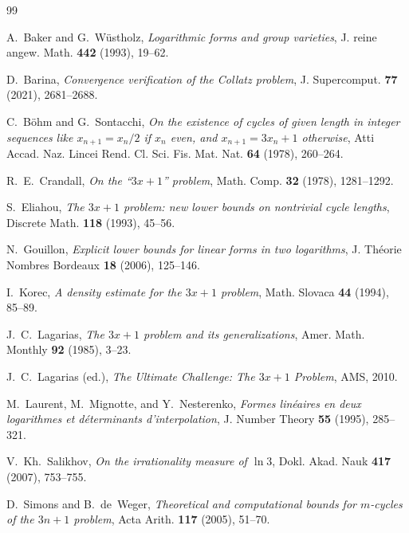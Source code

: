 \documentclass[11pt, a4paper]{amsart}
\theoremstyle{plain}
\theoremstyle{definition}
\theoremstyle{remark}
\begin{document}
\begin{thebibliography}{99}

A.~Baker and G.~W\"ustholz,
\emph{Logarithmic forms and group varieties},
J. reine angew. Math. \textbf{442} (1993), 19--62.

D.~Barina,
\emph{Convergence verification of the Collatz problem},
J. Supercomput. \textbf{77} (2021), 2681--2688.

C.~B\"ohm and G.~Sontacchi,
\emph{On the existence of cycles of given length in integer
sequences like $x_{n+1} = x_n/2$ if $x_n$ even, and
$x_{n+1} = 3x_n + 1$ otherwise},
Atti Accad. Naz. Lincei Rend. Cl. Sci. Fis. Mat. Nat.
\textbf{64} (1978), 260--264.

R.~E.~Crandall,
\emph{On the ``$3x + 1$'' problem},
Math. Comp. \textbf{32} (1978), 1281--1292.

S.~Eliahou,
\emph{The $3x + 1$ problem: new lower bounds on nontrivial
cycle lengths},
Discrete Math. \textbf{118} (1993), 45--56.

N.~Gouillon,
\emph{Explicit lower bounds for linear forms in two logarithms},
J. Th\'eorie Nombres Bordeaux \textbf{18} (2006), 125--146.

I.~Korec,
\emph{A density estimate for the $3x + 1$ problem},
Math. Slovaca \textbf{44} (1994), 85--89.

J.~C.~Lagarias,
\emph{The $3x + 1$ problem and its generalizations},
Amer. Math. Monthly \textbf{92} (1985), 3--23.

J.~C.~Lagarias (ed.),
\emph{The Ultimate Challenge: The $3x + 1$ Problem},
AMS, 2010.

M.~Laurent, M.~Mignotte, and Y.~Nesterenko,
\emph{Formes lin\'eaires en deux logarithmes et d\'eterminants
d'interpolation},
J. Number Theory \textbf{55} (1995), 285--321.

V.~Kh.~Salikhov,
\emph{On the irrationality measure of $\ln 3$},
Dokl. Akad. Nauk \textbf{417} (2007), 753--755.

D.~Simons and B.~de~Weger,
\emph{Theoretical and computational bounds for $m$-cycles of
the $3n + 1$ problem},
Acta Arith. \textbf{117} (2005), 51--70.


\end{thebibliography}
\end{document}
